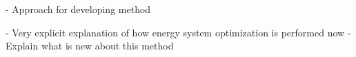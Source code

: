 - Approach for developing method

- Very explicit explanation of how energy system optimization is performed now
- Explain what is new about this method 

\begin{comment}
- Increased demand and a need to reduce CO2 emmisions 
- Fundamental change is needed (policy wise)
- Energy-economy models is an important tool 
- Modelers should focus on robust insights rather than point estimates
- Uncertainty in the models (Structural and parametric)
- Structural uncertainty is addressed with higher comlexity
- Parametric uncertainty is addressed with running multiple scenarios or sensitivity analysis
- Scenario approach does not include less expected real-world developments 
- Little to none possibility to validate models 
\end{comment}





\begin{comment}
- MGA \cite{Brill_MGA_1982}
- Feasible near optimal decision space 

Alternative solutions generated with energy-economy
optimization models also provide valuable insight that can be used to
challenge preconceptions and suggest creative alternatives to decision makers.
\end{comment}


